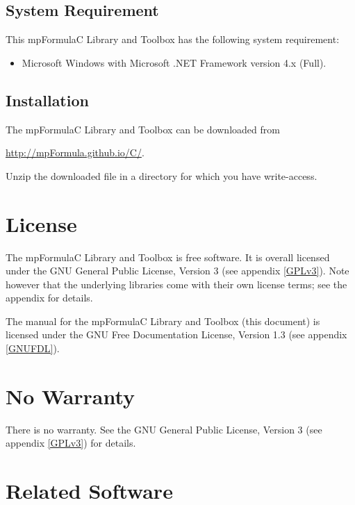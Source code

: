 \subsection{System Requirement}
\label{System Requirements}
This mpFormulaC Library and Toolbox has the following system requirement:

\begin{itemize}
	\item Microsoft Windows with Microsoft .NET Framework version 4.x (Full).
\end{itemize}



\subsection{Installation}
\label{Installation}
The mpFormulaC Library and Toolbox can be downloaded from 

\vpara
\href{http://mpFormula.github.io/C/}{http://mpFormula.github.io/C/}. 

\vpara
Unzip the downloaded file in a directory for which you have write-access.




\section{License}
\label{mpFormulaLicense}

The mpFormulaC Library and Toolbox is free software. It is overall licensed under the GNU General Public License, Version 3 (see appendix \ref{GPLv3}). Note however that the underlying libraries come with their own license terms; see the appendix for details.

The manual for the mpFormulaC Library and Toolbox (this document) is licensed under the GNU Free Documentation License, Version 1.3 (see appendix \ref{GNUFDL}).




\section{No Warranty}
\label{No Warranty} 

There is no warranty. See the GNU General Public License, Version 3 (see appendix \ref{GPLv3}) for details.


\section{Related Software}

